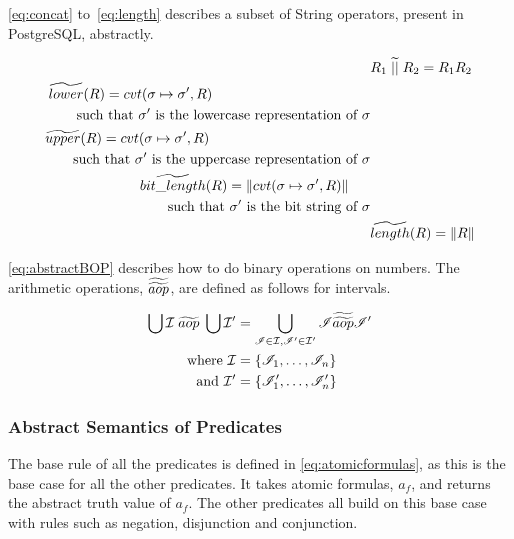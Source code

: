 \autoref{eq:concat} to~\ref{eq:length} describes a subset of String operators, present in PostgreSQL, abstractly.

\begin{align}\label{eq:concat}
    &R_1 \;\aab{||}\; R_2 = R_1 R_2 \\
    \begin{split}
        &\aab{lower}(R) = cvt(\sigma \mapsto \sigma', R) \\
        & \quad \quad \text{such } \text{that } \sigma' \text{ is the lowercase representation of } \sigma
    \end{split}\\
    \begin{split}
        & \aab{upper}(R) = cvt(\sigma \mapsto \sigma', R) \\
        & \quad \quad \text{such } \text{that $\sigma'$ is the uppercase representation of $\sigma$}
    \end{split}\\
    \begin{split}
        &\aab{bit\_length}(R) = \|cvt(\sigma \mapsto \sigma', R)\| \\
        & \quad \quad \text{such } \text{that $\sigma'$ is the bit string of $\sigma$}
    \end{split} \\ \label{eq:length}
    &\aab{length}(R) = \|R\|
\end{align}

\autoref{eq:abstractBOP} describes how to do binary operations on numbers.
The arithmetic operations, $\widetilde{\widetilde{aop}}$, are defined as follows for intervals.

\begin{align}\label{eq:abstractBOP}
    \bigcup \mathcal{I} \;\aab{aop}\; \bigcup \mathcal{I}' &= \bigcup_{\mathscr{I}\in \mathcal{I}, \mathscr{I}'\in \mathcal{I}'}\mathscr{I}\aaab{aop}\mathscr{I}'\nonumber\\
    \text{where } \mathcal{I}&=\{\mathscr{I}_1,\dots,\mathscr{I}_n\}\nonumber\\
    \text{and } \mathcal{I}'&=\{\mathscr{I}'_1,\dots,\mathscr{I}'_n\}
\end{align}

\subsubsection{Abstract Semantics of Predicates}
The base rule of all the predicates is defined in \autoref{eq:atomicformulas}, as this is the base case for all the other predicates.
It takes atomic formulas, $a_f$, and returns the abstract truth value of $a_f$.
The other predicates all build on this base case with rules such as negation, disjunction and conjunction.


